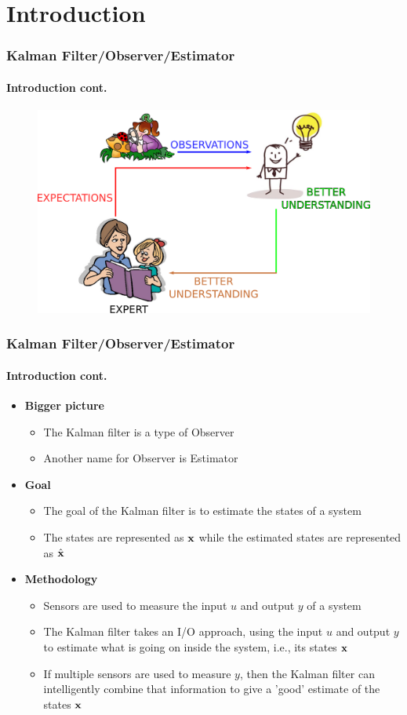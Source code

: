 \section{Introduction}


\begin{frame}\pw\Large
\frametitle{Kalman Filter/Observer/Estimator}
\framesubtitle{Introduction \tiny cont.}
\begin{figure}
\includegraphics[width=1\textwidth]{figs/WFAR11_UCP_Update_Prediction_BlockDiagram.pdf}
\end{figure}
\end{frame}


\begin{frame}\pw\Large
\frametitle{Kalman Filter/Observer/Estimator}
\framesubtitle{Introduction \tiny cont.}
\begin{itemize}
\item \textbf{Bigger picture}
\begin{itemize}\scriptsize
\item The Kalman filter is a type of {\color{blue}Observer}
\item Another name for Observer is Estimator
\end{itemize}
\item \textbf{Goal}
\begin{itemize}\scriptsize
\item The goal of the Kalman filter is to estimate the states of a system
\item The states are represented as $\textbf{x}$ while the estimated states are represented as $\hat{\textbf{x}}$
\end{itemize}
\item \textbf{Methodology}
\begin{itemize}\scriptsize
\item Sensors are used to measure the input $u$ and output $y$ of a system
\item The Kalman filter takes an I/O approach, using the input $u$ and output $y$ to estimate what is going on inside the system, i.e., its states $\textbf{x}$
\item If multiple sensors are used to measure $y$, then the Kalman filter can intelligently combine that information to give a 'good' estimate of the states $\textbf{x}$
\end{itemize}
\end{itemize}
\end{frame}





